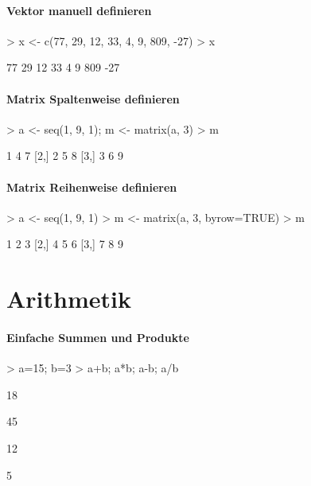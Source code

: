 \paragraph{Vektor manuell definieren}
\begin{Schunk}
\begin{Sinput}
> x <- c(77, 29, 12, 33, 4, 9, 809, -27)
> x
\end{Sinput}
\begin{Soutput}
[1]  77  29  12  33   4   9 809 -27
\end{Soutput}
\end{Schunk}

\paragraph{Matrix Spaltenweise definieren}
\begin{Schunk}
\begin{Sinput}
> a <- seq(1, 9, 1); m <- matrix(a, 3)
> m
\end{Sinput}
\begin{Soutput}
     [,1] [,2] [,3]
[1,]    1    4    7
[2,]    2    5    8
[3,]    3    6    9
\end{Soutput}
\end{Schunk}

\paragraph{Matrix Reihenweise definieren}
\begin{Schunk}
\begin{Sinput}
> a <- seq(1, 9, 1)
> m <- matrix(a, 3, byrow=TRUE)
> m
\end{Sinput}
\begin{Soutput}
     [,1] [,2] [,3]
[1,]    1    2    3
[2,]    4    5    6
[3,]    7    8    9
\end{Soutput}
\end{Schunk}

\section{Arithmetik}
\paragraph{Einfache Summen und Produkte}
\begin{Schunk}
\begin{Sinput}
> a=15; b=3
> a+b; a*b; a-b; a/b
\end{Sinput}
\begin{Soutput}
[1] 18
\end{Soutput}
\begin{Soutput}
[1] 45
\end{Soutput}
\begin{Soutput}
[1] 12
\end{Soutput}
\begin{Soutput}
[1] 5
\end{Soutput}
\end{Schunk}

